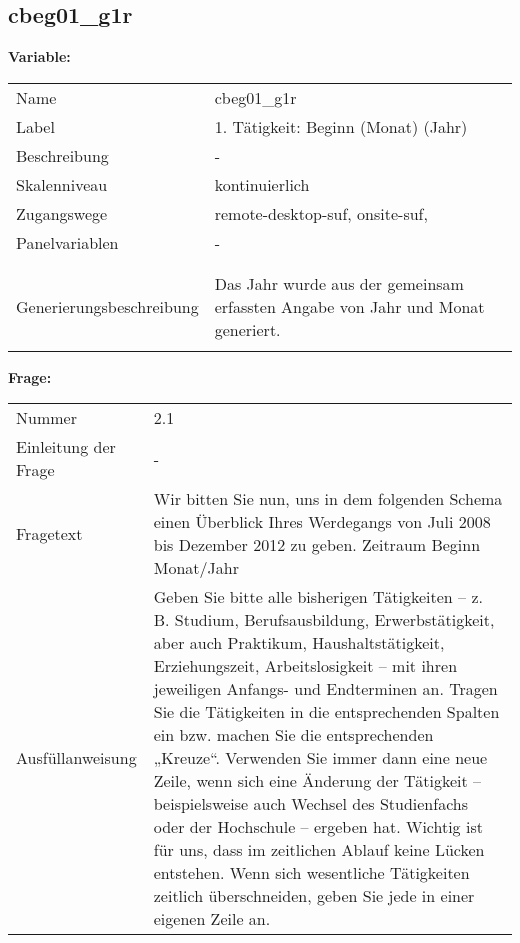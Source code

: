 	
	
	\subsection{cbeg01\_g1r}
	\label{subSection:cbeg01_g1r}

	\noindent\textbf{Variable:}\\
		\begin{tabular}{lL{11.3cm}}
			\label{tableVariable:cbeg01_g1r}
			Name & cbeg01\_g1r \\
			Label & 1. Tätigkeit: Beginn (Monat) (Jahr) \\
			Beschreibung & - \\
			Skalenniveau & kontinuierlich \\
			Zugangswege &
				remote-desktop-suf,
				onsite-suf,
 \\
			Panelvariablen & -
			 \\
			 \\
 \\
					Generierungsbeschreibung & Das Jahr wurde aus der gemeinsam erfassten Angabe von Jahr und Monat generiert. 
				 \\	
			 \\
		\end{tabular}

		\vspace*{1 cm}
		\noindent\textbf{Frage:}\\
		\begin{tabular}{lL{11.3cm}}
			\label{tableQuestion:cbeg01_g1r}
			Nummer & 2.1 \\
			Einleitung der Frage & - \\
			Fragetext & Wir bitten Sie nun, uns in dem folgenden Schema einen Überblick Ihres Werdegangs von Juli 2008 bis Dezember 2012 zu geben.
Zeitraum
Beginn
Monat/Jahr \\
			Ausfüllanweisung & Geben Sie bitte alle bisherigen Tätigkeiten – z. B. Studium, Berufsausbildung, Erwerbstätigkeit, aber auch Praktikum, Haushaltstätigkeit,
Erziehungszeit, Arbeitslosigkeit – mit ihren jeweiligen Anfangs- und Endterminen an. Tragen Sie die Tätigkeiten in die entsprechenden Spalten ein bzw. machen Sie die entsprechenden „Kreuze“. Verwenden Sie immer dann eine neue Zeile, wenn sich eine Änderung der Tätigkeit – beispielsweise auch Wechsel des Studienfachs oder der Hochschule – ergeben hat. Wichtig ist für uns, dass im zeitlichen Ablauf keine Lücken entstehen. Wenn sich wesentliche Tätigkeiten zeitlich überschneiden, geben Sie jede in einer eigenen Zeile an. \\
		\end{tabular}




